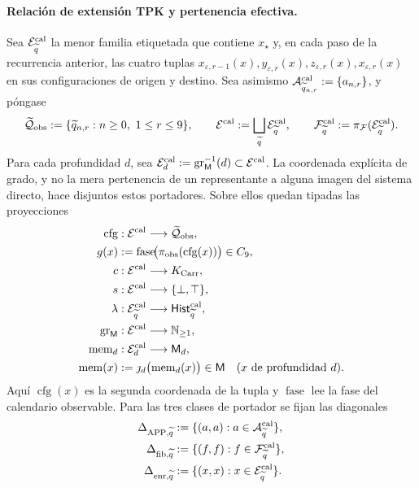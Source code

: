 \paragraph{Relación de extensión TPK y pertenencia efectiva.}
Sea \(\mathcal E^{\rm cal}_{\widetilde q}\) la menor familia etiquetada que contiene
\(x_\star\) y, en cada paso de la recurrencia anterior, las cuatro tuplas
\(x_{\varepsilon,r-1}(x),y_{\varepsilon,r}(x),
z_{\varepsilon,r}(x),x_{\varepsilon,r}(x)\) en sus configuraciones de origen
y destino. Sea asimismo
\(\mathcal A^{\rm cal}_{\widetilde q_{n,r}}:=\{a_{n,r}\}\), y póngase
\[
 \widetilde{\mathcal Q}_{\rm obs}:=
   \{\widetilde q_{n,r}:n\ge0,\ 1\le r\le9\},
 \qquad
 \mathcal E^{\rm cal}:=\bigsqcup_{\widetilde q}
     \mathcal E^{\rm cal}_{\widetilde q},
 \qquad
 \mathcal F^{\rm cal}_{\widetilde q}:=
     \pi_{\mathcal F}(\mathcal E^{\rm cal}_{\widetilde q}).
\]
Para cada profundidad \(d\), sea
\(\mathcal E^{\rm cal}_d:=
\operatorname{gr}_{\mathsf M}^{-1}(d)\subset\mathcal E^{\rm cal}\). La
coordenada explícita de grado, y no la mera pertenencia de un representante a
alguna imagen del sistema directo, hace disjuntos estos portadores. Sobre ellos
quedan tipadas las proyecciones
\[
\begin{aligned}
 \operatorname{cfg}&:\mathcal E^{\rm cal}\longrightarrow
     \widetilde{\mathcal Q}_{\rm obs},\\
 g(x)&:=\operatorname{fase}\!
       \bigl(\pi_{\rm obs}(\operatorname{cfg}(x))\bigr)\in C_9,\\
 c&:\mathcal E^{\rm cal}\longrightarrow K_{\rm Carr},\\
 s&:\mathcal E^{\rm cal}\longrightarrow\{\bot,\top\},\\
 \lambda&:\mathcal E^{\rm cal}_{\widetilde q}
       \longrightarrow\mathsf{Hist}^{\rm cal}_{\widetilde q},\\
 \operatorname{gr}_{\mathsf M}&:\mathcal E^{\rm cal}
       \longrightarrow\mathbb N_{\ge1},\\
 \operatorname{mem}_d&:\mathcal E^{\rm cal}_d
       \longrightarrow\mathsf M_d,\\
 \operatorname{mem}(x)&:=
       \jmath_d\bigl(\operatorname{mem}_d(x)\bigr)\in\mathsf M
       \quad(x\text{ de profundidad }d).
\end{aligned}
\]
Aquí \(\operatorname{cfg}(x)\) es la segunda coordenada de la tupla y
\(\operatorname{fase}\) lee la fase del calendario observable. Para las tres
clases de portador se fijan las diagonales
\[
\begin{aligned}
 \Delta_{\mathrm{APP},\widetilde q}
   &:=\{(a,a):a\in\mathcal A^{\rm cal}_{\widetilde q}\},\\
 \Delta_{{\rm fib},\widetilde q}
   &:=\{(f,f):f\in\mathcal F^{\rm cal}_{\widetilde q}\},\\
 \Delta_{{\rm enr},\widetilde q}
   &:=\{(x,x):x\in\mathcal E^{\rm cal}_{\widetilde q}\}.
\end{aligned}
\]
